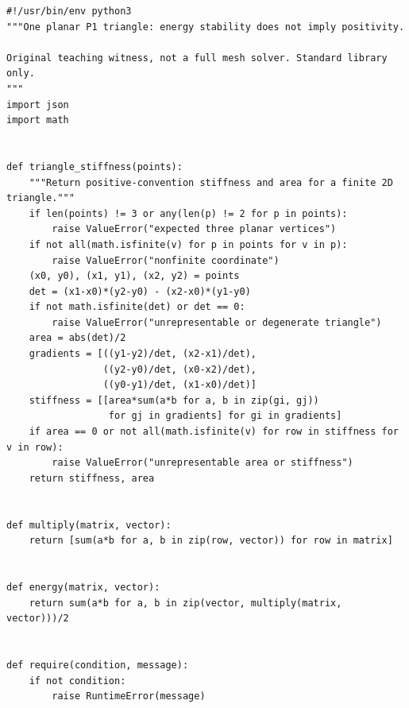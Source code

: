 \begin{verbatim}
#!/usr/bin/env python3
"""One planar P1 triangle: energy stability does not imply positivity.

Original teaching witness, not a full mesh solver. Standard library only.
"""
import json
import math


def triangle_stiffness(points):
    """Return positive-convention stiffness and area for a finite 2D triangle."""
    if len(points) != 3 or any(len(p) != 2 for p in points):
        raise ValueError("expected three planar vertices")
    if not all(math.isfinite(v) for p in points for v in p):
        raise ValueError("nonfinite coordinate")
    (x0, y0), (x1, y1), (x2, y2) = points
    det = (x1-x0)*(y2-y0) - (x2-x0)*(y1-y0)
    if not math.isfinite(det) or det == 0:
        raise ValueError("unrepresentable or degenerate triangle")
    area = abs(det)/2
    gradients = [((y1-y2)/det, (x2-x1)/det),
                 ((y2-y0)/det, (x0-x2)/det),
                 ((y0-y1)/det, (x1-x0)/det)]
    stiffness = [[area*sum(a*b for a, b in zip(gi, gj))
                  for gj in gradients] for gi in gradients]
    if area == 0 or not all(math.isfinite(v) for row in stiffness for v in row):
        raise ValueError("unrepresentable area or stiffness")
    return stiffness, area


def multiply(matrix, vector):
    return [sum(a*b for a, b in zip(row, vector)) for row in matrix]


def energy(matrix, vector):
    return sum(a*b for a, b in zip(vector, multiply(matrix, vector)))/2


def require(condition, message):
    if not condition:
        raise RuntimeError(message)



\end{verbatim}
